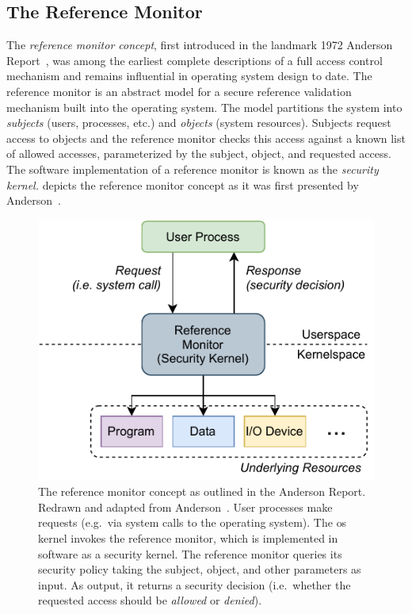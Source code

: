 \documentclass[
  fontsize=12pt,
  titlepage=firstiscover,
  paper=letter,
oneside,
  cleardoublepage=plain,
  parskip=half-,
  DIV=10,
  parindent,
  appendixprefix,
  chapterprefix,
  listof=totoc,
]{scrbook}
\begin{document}
\subsection{The Reference Monitor}\label{ss:refmon}

The \textit{reference monitor concept}, first introduced in the landmark 1972 Anderson
Report~\cite{anderson1972_report}, was among the earliest complete descriptions of a full
access control mechanism and remains influential in operating system design to date. The
reference monitor is an abstract model for a secure reference validation mechanism built
into the operating system. The model partitions the system into \textit{subjects} (users,
processes, etc.) and \textit{objects} (system resources).  Subjects request access to
objects and the reference monitor checks this access against a known list of allowed
accesses, parameterized by the subject, object, and requested access. The software
implementation of a reference monitor is known as the \textit{security kernel.}
 depicts the reference monitor concept as it was first presented by
Anderson~\cite{anderson1972_report}.

\begin{figure}[htbp]
  \centering
  \includegraphics[width=0.6\linewidth]{figs/background/refmon.pdf}
  \caption[The reference monitor concept]{
    The reference monitor concept as outlined in the Anderson Report. Redrawn and adapted
    from Anderson~\cite{anderson1972_report}. User processes make requests (e.g.\ via
    system calls to the operating system). The \gls{os} kernel invokes the reference
    monitor, which is implemented in software as a security kernel. The reference monitor
    queries its security policy taking the subject, object, and other parameters as input.
    As output, it returns a security decision (i.e.\ whether the requested access should be
    \textit{allowed} or \textit{denied}).
  }\label{fig:refmon}
\end{figure}
\end{document}
